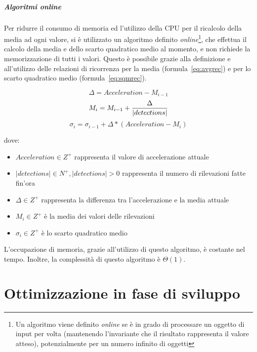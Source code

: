 \documentclass[a4paper,10pt]{memoir}
\begin{document}
\paragraph{Algoritmi \textit{online}} Per ridurre il consumo di memoria ed l'utilizzo della CPU per il ricalcolo della media ad ogni valore, si è utilizzato un algoritmo definito \textit{online}\footnote{Un algoritmo viene definito \textit{online} se è in grado di processare un oggetto di input per volta (mantenendo l'invariante che il risultato rappresenta il valore atteso), potenzialmente per un numero infinito di oggetti}, che effettua il calcolo della media e dello scarto quadratico medio al momento, e non richiede la memorizzazione di tutti i valori. Questo è possibile grazie alla definizione e all'utilizzo delle relazioni di ricorrenza per la media (formula~\ref{eq:avgrec}) e per lo scarto quadratico medio (formula~\ref{eq:sqmrec}).

\begin{equation}
\Delta = Acceleration - M_{i-1}
\end{equation}
\begin{equation}
\label{eq:avgrec}
M_i = M_{i-1} + {\Delta \over |detections|}
\end{equation}
\begin{equation}
\label{eq:sqmrec}
\sigma_i = \sigma_{i-1} + \Delta * (Acceleration - M_i)
\end{equation}

dove: \begin{itemize}
\item $Acceleration \in Z^+$ rappresenta il valore di accelerazione attuale
\item $|detections| \in N^+, |detections| > 0$ rappresenta il numero di rilevazioni fatte fin'ora
\item $\Delta \in Z^+$ rappresenta la differenza tra l'accelerazione e la media attuale
\item $M_i \in Z^+$ è la media dei valori delle rilevazioni
\item $\sigma_i \in Z^+$ è lo scarto quadratico medio
\end{itemize}

L'occupazione di memoria, grazie all'utilizzo di questo algoritmo, è costante nel tempo. Inoltre, la complessità di questo algoritmo è $\Theta(1)$.

\chapter{Ottimizzazione in fase di sviluppo}
\end{document}
